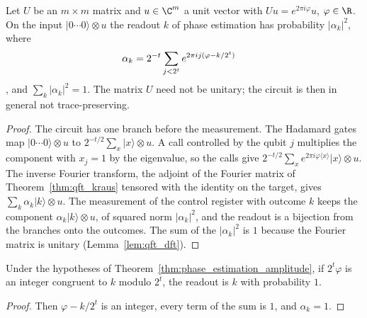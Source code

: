\begin{theorem}
    \label{thm:phase_estimation_amplitude}
    \leanok
    Let $U$ be an $m\times m$ matrix and $u\in\C^m$ a unit vector with
    $Uu=e^{2\pi i\varphi}u$, $\varphi\in\R$. On the input
    $\lvert0\cdots0\rangle\otimes u$ the readout $k$ of phase estimation has probability
    $\lvert\alpha_k\rvert^2$, where
    \begin{align}
        \alpha_k&=2^{-t}\sum_{j<2^t}e^{2\pi ij(\varphi-k/2^t)}
        \notag
    \end{align}
    \cite[eq.~(5.24)]{NielsenChuang2010}, and $\sum_k\lvert\alpha_k\rvert^2=1$. The matrix $U$
    need not be unitary; the circuit is then in general not trace-preserving.
\end{theorem}
\begin{proof}\leanok
    The circuit has one branch before the measurement. The Hadamard gates map
    $\lvert0\cdots0\rangle\otimes u$ to $2^{-t/2}\sum_x\lvert x\rangle\otimes u$. A call
    controlled by the qubit $j$ multiplies the component with $x_j=1$ by the
    eigenvalue, so the calls give
    $2^{-t/2}\sum_xe^{2\pi i\varphi\langle x\rangle}\lvert x\rangle\otimes u$. The inverse
    Fourier transform, the adjoint of the Fourier matrix of
    Theorem~\ref{thm:qft_kraus} tensored with the identity on the target, gives
    $\sum_k\alpha_k\lvert k\rangle\otimes u$. The measurement of the control register
    with outcome $k$ keeps the component $\alpha_k\lvert k\rangle\otimes u$, of squared
    norm $\lvert\alpha_k\rvert^2$, and the readout is a bijection from the branches onto
    the outcomes. The sum of the $\lvert\alpha_k\rvert^2$ is $1$ because the Fourier matrix
    is unitary (Lemma~\ref{lem:qft_dft}).
\end{proof}

\begin{corollary}
    \label{cor:phase_estimation_exact}
    \leanok
    Under the hypotheses of Theorem~\ref{thm:phase_estimation_amplitude}, if $2^t\varphi$
    is an integer congruent to $k$ modulo $2^t$, the readout is $k$ with probability $1$.
\end{corollary}
\begin{proof}\leanok
    Then $\varphi-k/2^t$ is an integer, every term of the sum is $1$, and $\alpha_k=1$.
\end{proof}

